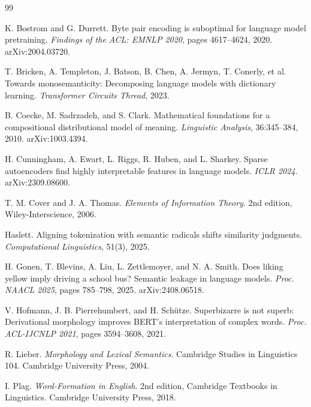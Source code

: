 \documentclass[11pt,a4paper]{article}
\begin{document}
\begin{thebibliography}{99}

K. Bostrom and G. Durrett.
\newblock Byte pair encoding is suboptimal for language model pretraining.
\newblock \emph{Findings of the ACL: EMNLP 2020}, pages 4617--4624, 2020.
\newblock arXiv:2004.03720.

T. Bricken, A. Templeton, J. Batson, B. Chen, A. Jermyn, T. Conerly, et al.
\newblock Towards monosemanticity: Decomposing language models with dictionary learning.
\newblock \emph{Transformer Circuits Thread}, 2023.

B. Coecke, M. Sadrzadeh, and S. Clark.
\newblock Mathematical foundations for a compositional distributional model of meaning.
\newblock \emph{Linguistic Analysis}, 36:345--384, 2010.
\newblock arXiv:1003.4394.

H. Cunningham, A. Ewart, L. Riggs, R. Huben, and L. Sharkey.
\newblock Sparse autoencoders find highly interpretable features in language models.
\newblock \emph{ICLR 2024}.
\newblock arXiv:2309.08600.

T. M. Cover and J. A. Thomas.
\newblock \emph{Elements of Information Theory}.
\newblock 2nd edition, Wiley-Interscience, 2006.

Haslett.
\newblock Aligning tokenization with semantic radicals shifts similarity judgments.
\newblock \emph{Computational Linguistics}, 51(3), 2025.

H. Gonen, T. Blevins, A. Liu, L. Zettlemoyer, and N. A. Smith.
\newblock Does liking yellow imply driving a school bus? Semantic leakage in language models.
\newblock \emph{Proc. NAACL 2025}, pages 785--798, 2025.
\newblock arXiv:2408.06518.

V. Hofmann, J. B. Pierrehumbert, and H. Schütze.
\newblock Superbizarre is not superb: Derivational morphology improves BERT's interpretation of complex words.
\newblock \emph{Proc. ACL-IJCNLP 2021}, pages 3594--3608, 2021.

R. Lieber.
\newblock \emph{Morphology and Lexical Semantics}.
\newblock Cambridge Studies in Linguistics 104. Cambridge University Press, 2004.

I. Plag.
\newblock \emph{Word-Formation in English}.
\newblock 2nd edition, Cambridge Textbooks in Linguistics. Cambridge University Press, 2018.


\end{thebibliography}
\end{document}
